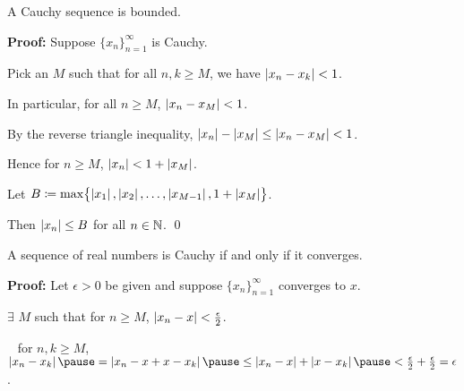 \documentclass[10pt,aspectratio=169]{beamer}
\begin{document}
\begin{frame}

\begin{proposition}
A Cauchy sequence is bounded.
\end{proposition}

\pause
\textbf{Proof:}
Suppose $\{ x_n \}_{n=1}^\infty$ is Cauchy.

\pause
\medskip

Pick an $M$ such that for all
$n,k \geq M$, we have $\left\lvert {x_n-x_k} \right\rvert < 1$.

\pause
\medskip

In particular,
for all $n \geq M$, \quad
$\left\lvert {x_n - x_M} \right\rvert < 1$.

\pause
By the reverse triangle inequality, \quad
$\left\lvert {x_n} \right\rvert - \left\lvert {x_M} \right\rvert \leq \left\lvert {x_n - x_M} \right\rvert < 1$.

\pause
\medskip

Hence for $n \geq M$, \quad
$\left\lvert {x_n} \right\rvert < 1 + \left\lvert {x_M} \right\rvert$.

\pause
\medskip

Let
$B \coloneqq \max \bigl\{ \left\lvert {x_1} \right\rvert, \left\lvert {x_2} \right\rvert, \ldots, \left\lvert {x_{M-1}} \right\rvert, 1+ \left\lvert {x_M} \right\rvert
\bigr\}$.

\pause
\medskip

Then $\left\lvert {x_n} \right\rvert \leq B$ for all $n \in {\mathbb{N}}$.
\qed
\end{frame}

\begin{frame}

\begin{theorem}
A sequence of real numbers is Cauchy if and only if it converges.
\end{theorem}

\pause
\textbf{Proof:}
Let $\epsilon > 0$ be given and
suppose $\{ x_n \}_{n=1}^\infty$ converges to $x$.

\pause
$\exists$ $M$ such that for $n \geq M$, \quad
$\left\lvert {x_n - x} \right\rvert < \frac{\epsilon}{2}$.

\pause
\medskip

\thus ~ for $n,k \geq M$,
\quad
$\abs{x_n - x_k}
\pause
=
\abs{x_n - x + x - x_k}
\pause
\leq \abs{x_n-x} + \abs{x-x_k}
\pause
< \frac{\epsilon}{2} + \frac{\epsilon}{2} = \epsilon$.

\end{frame}
\end{document}
